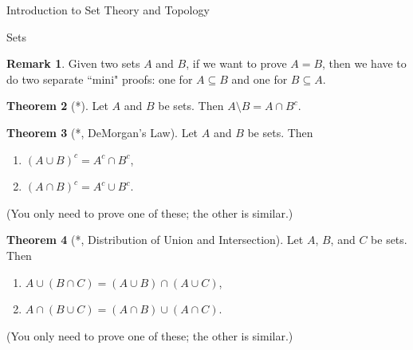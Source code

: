 \documentclass[11pt]{article}
\theoremstyle{definition}
\newtheorem{theorem}{Theorem}[section]
\newtheorem{remark}[theorem]{Remark}
\begin{document}
\begin{section}{Introduction to Set Theory and Topology}
\begin{subsection}{Sets}
\begin{remark}
Given two sets $A$ and $B$, if we want to prove $A=B$, then we have to do two separate ``mini" proofs: one for $A\subseteq B$ and one for $B\subseteq A$.
\end{remark}

\begin{theorem}[*]
Let $A$ and $B$ be sets.  Then $A\setminus B = A \cap B^c$.
\end{theorem}

\begin{theorem}[*, DeMorgan's Law]
Let $A$ and $B$ be sets. Then 
\begin{enumerate}
\item $(A \cup B)^c = A^c \cap B^c$,
\item $(A \cap B)^c = A^c \cup B^c$.
\end{enumerate}
(You only need to prove one of these; the other is similar.)
\end{theorem}

\begin{theorem}[*, Distribution of Union and Intersection]
Let $A$, $B$, and $C$ be sets. Then
\begin{enumerate}
\item $A \cup(B\cap C) = (A\cup B)\cap (A\cup C)$,
\item $A\cap (B\cup C)= (A\cap B)\cup (A\cap C)$.
\end{enumerate}
(You only need to prove one of these; the other is similar.)
\end{theorem}

\end{subsection}

\end{section}
\end{document}
